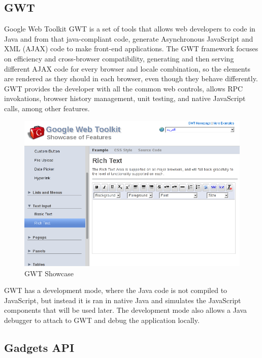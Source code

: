 \subsection{GWT}

Google Web Toolkit GWT is a set of tools that allows web developers to code in Java and from that java-compliant code, generate Asynchronous JavaScript and XML (AJAX) code to make front-end applications. The GWT framework focuses on efficiency and cross-browser compatibility, generating and then serving different AJAX code for every browser and locale combination, so the elements are rendered as they should in each browser, even though they behave differently. GWT provides the developer with all the common web controls, allows RPC invokations, browser history management, unit testing, and native JavaScript calls, among other features.

\begin{figure}[h]
  \center
    \includegraphics[keepaspectratio, scale=0.4]{Media/Captures/GWT/gwt_showcase.png}
  \caption{GWT Showcase}
  \label{fig:gwt_showcase}
\end{figure}

GWT has a development mode, where the Java code is not compiled to JavaScript, but instead it is ran in native Java and simulates the JavaScript components that will be used later. The development mode also allows a Java debugger to attach to GWT and debug the application locally. 


\subsection{Gadgets API}


